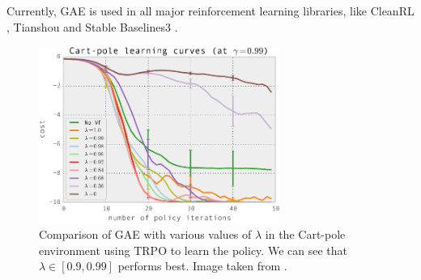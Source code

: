 Currently, GAE is used in all major reinforcement learning libraries, like CleanRL \cite{huang2022cleanrl}, Tianshou \cite{tianshou} and Stable Baselines3 \cite{stable-baselines3}.
\begin{figure}[H]
    \centering
    \includegraphics[width=0.7\textwidth]{images/gae-comparison.png}
    \caption{Comparison of GAE with various values of $\lambda$ in the Cart-pole environment using TRPO to learn the policy. We can see that $\lambda \in [0.9, 0.99]$ performs best. Image taken from \cite{schulman2015high}.}
    \label{fig:gae-comparison}
\end{figure}